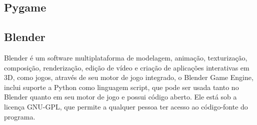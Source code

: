 \subsection{Pygame}

\subsection{Blender}

Blender é um software multiplataforma de modelagem, animação, texturização, composição, renderização,
edição de vídeo e criação de aplicações interativas em 3D, como jogos, através de seu
motor de jogo integrado, o Blender Game Engine, inclui suporte a Python como linguagem
script, que pode ser usada tanto no Blender quanto em seu motor de jogo e possui código aberto.
Ele está sob a licença GNU-GPL, que permite a qualquer pessoa ter acesso ao código-fonte do programa.\cite{Blender3D}

